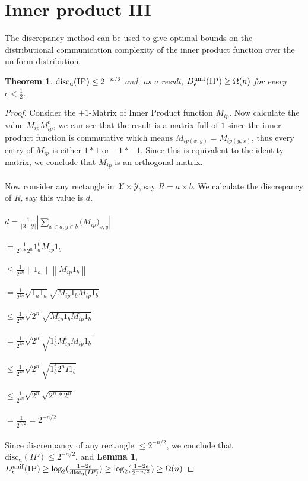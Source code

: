 \documentclass[11pt,oneside]{book}
\theoremstyle{plain}
\newtheorem{theorem}{Theorem}
\theoremstyle{definition}
\theoremstyle{plain}
\newcommand{\calX}{\mathcal{X}}
\newcommand{\calY}{\mathcal{Y}}
\newcommand{\discu}{\mathrm{disc_u}}
\newcommand{\IP}{\textsc{IP}}
\begin{document}
 \section{Inner product III}

The discrepancy method can be used to give optimal bounds on the distributional communication complexity of the inner product function over the uniform distribution.

\begin{theorem}
	$\discu(\IP) \le 2^{-n/2}$ and, as a result, $D_\epsilon^{\mathrm{unif}}(\IP) \ge \Omega(n)$ for every $\epsilon < \frac12$.
\end{theorem}

\begin{proof}
	Consider the $\pm1$-Matrix of Inner Product function $M_{ip}$. Now calculate the value $M_{ip}M_{ip}^t$, we can see that the result is a matrix full of $1$ since the inner product function is commutative which means $M_{ip(x,y)} = M_{ip(y,x)}$, thus every entry of $M_{ip}$ is either $1*1$ or $-1*-1$. Since this is equivalent to the identity matrix, we conclude that $M_{ip}$ is an orthogonal matrix. \\
	\\
	Now consider any rectangle in $\calX \times \calY$, say $R = a \times b$. We calculate the discrepancy of $R$, say this value is $d$. \\
	\\
	$d = \frac{1}{|\calX||\calY|}|\sum_{x \in a,y \in b} \big(M_{ip}\big)_{x,y}|$ \\
	\\
	$= \frac{1}{2^n*2^n}1_a^tM_{ip}1_b$\\
	\\
	$\leq \frac{1}{2^{2n}}\left\lVert 1_a\right\rVert \left\lVert M_{ip}1_b\right\rVert$\\
	\\
	$= \frac{1}{2^{2n}}\sqrt{1_a1_a}\sqrt{M_{ip}1_bM_{ip}1_b}$\\
	\\
	$\leq \frac{1}{2^{2n}}\sqrt{2^n}\sqrt{M_{ip}1_bM_{ip}1_b}$ \\
	\\
	$= \frac{1}{2^{2n}}\sqrt{2^n}\sqrt{1_b^tM_{ip}^tM_{ip}1_b}$ \\
	\\
	$\leq \frac{1}{2^{2n}}\sqrt{2^n}\sqrt{1_b^t2^nI1_b}$\\ 
	\\
	$\leq \frac{1}{2^{2n}}\sqrt{2^n}\sqrt{2^n*2^n}$\\
	\\
	$= \frac{1}{2^{n/2}} = 2^{-n/2}$\\
	\\
	Since discrenpancy of any rectangle $\leq 2^{-n/2}$, we conclude that $\discu(IP) \leq 2^{-n/2}$, and \textbf{Lemma 1}, $D_\epsilon^{\mathrm{unif}}(\IP) \ge \log_2(\frac{1-2\epsilon}{\discu(IP)}) \ge \log_2(\frac{1-2\epsilon}{2^{-n/2}}) \ge \Omega(n)$
\end{proof} 
\end{document}
